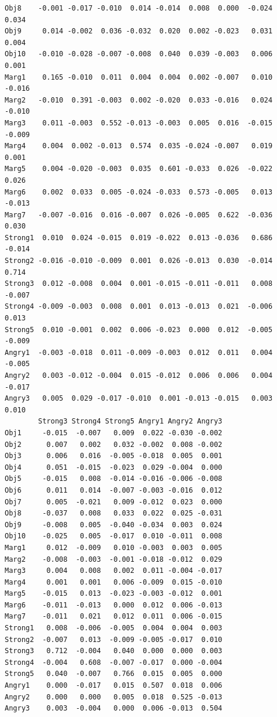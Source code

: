 \documentclass[
  english,
]{book}
\begin{document}
\begin{verbatim}
Obj8    -0.001 -0.017 -0.010  0.014 -0.014  0.008  0.000  -0.024   0.034
Obj9     0.014 -0.002  0.036 -0.032  0.020  0.002 -0.023   0.031   0.004
Obj10   -0.010 -0.028 -0.007 -0.008  0.040  0.039 -0.003   0.006   0.001
Marg1    0.165 -0.010  0.011  0.004  0.004  0.002 -0.007   0.010  -0.016
Marg2   -0.010  0.391 -0.003  0.002 -0.020  0.033 -0.016   0.024  -0.010
Marg3    0.011 -0.003  0.552 -0.013 -0.003  0.005  0.016  -0.015  -0.009
Marg4    0.004  0.002 -0.013  0.574  0.035 -0.024 -0.007   0.019   0.001
Marg5    0.004 -0.020 -0.003  0.035  0.601 -0.033  0.026  -0.022   0.026
Marg6    0.002  0.033  0.005 -0.024 -0.033  0.573 -0.005   0.013  -0.013
Marg7   -0.007 -0.016  0.016 -0.007  0.026 -0.005  0.622  -0.036   0.030
Strong1  0.010  0.024 -0.015  0.019 -0.022  0.013 -0.036   0.686  -0.014
Strong2 -0.016 -0.010 -0.009  0.001  0.026 -0.013  0.030  -0.014   0.714
Strong3  0.012 -0.008  0.004  0.001 -0.015 -0.011 -0.011   0.008  -0.007
Strong4 -0.009 -0.003  0.008  0.001  0.013 -0.013  0.021  -0.006   0.013
Strong5  0.010 -0.001  0.002  0.006 -0.023  0.000  0.012  -0.005  -0.009
Angry1  -0.003 -0.018  0.011 -0.009 -0.003  0.012  0.011   0.004  -0.005
Angry2   0.003 -0.012 -0.004  0.015 -0.012  0.006  0.006   0.004  -0.017
Angry3   0.005  0.029 -0.017 -0.010  0.001 -0.013 -0.015   0.003   0.010
        Strong3 Strong4 Strong5 Angry1 Angry2 Angry3
Obj1     -0.015  -0.007   0.009  0.022 -0.030 -0.002
Obj2      0.007   0.002   0.032 -0.002  0.008 -0.002
Obj3      0.006   0.016  -0.005 -0.018  0.005  0.001
Obj4      0.051  -0.015  -0.023  0.029 -0.004  0.000
Obj5     -0.015   0.008  -0.014 -0.016 -0.006 -0.008
Obj6      0.011   0.014  -0.007 -0.003 -0.016  0.012
Obj7      0.005  -0.021   0.009 -0.012  0.023  0.000
Obj8     -0.037   0.008   0.033  0.022  0.025 -0.031
Obj9     -0.008   0.005  -0.040 -0.034  0.003  0.024
Obj10    -0.025   0.005  -0.017  0.010 -0.011  0.008
Marg1     0.012  -0.009   0.010 -0.003  0.003  0.005
Marg2    -0.008  -0.003  -0.001 -0.018 -0.012  0.029
Marg3     0.004   0.008   0.002  0.011 -0.004 -0.017
Marg4     0.001   0.001   0.006 -0.009  0.015 -0.010
Marg5    -0.015   0.013  -0.023 -0.003 -0.012  0.001
Marg6    -0.011  -0.013   0.000  0.012  0.006 -0.013
Marg7    -0.011   0.021   0.012  0.011  0.006 -0.015
Strong1   0.008  -0.006  -0.005  0.004  0.004  0.003
Strong2  -0.007   0.013  -0.009 -0.005 -0.017  0.010
Strong3   0.712  -0.004   0.040  0.000  0.000  0.003
Strong4  -0.004   0.608  -0.007 -0.017  0.000 -0.004
Strong5   0.040  -0.007   0.766  0.015  0.005  0.000
Angry1    0.000  -0.017   0.015  0.507  0.018  0.006
Angry2    0.000   0.000   0.005  0.018  0.525 -0.013
Angry3    0.003  -0.004   0.000  0.006 -0.013  0.504
\end{verbatim}
\end{document}
